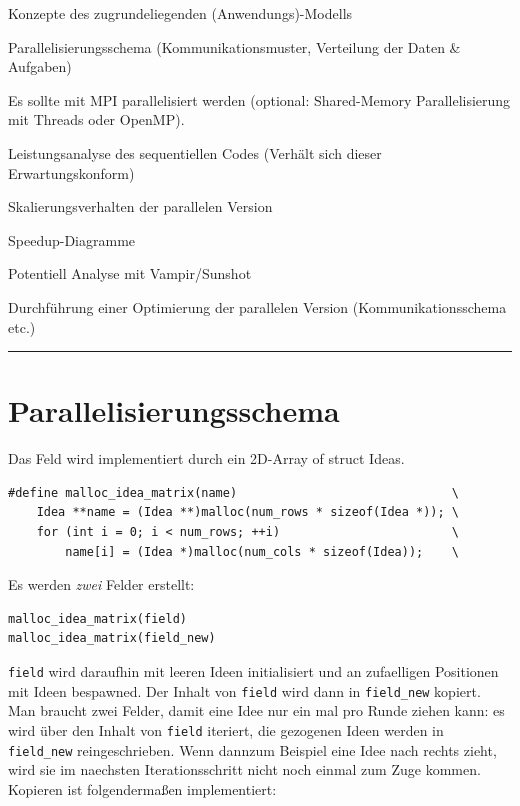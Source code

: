 Konzepte des zugrundeliegenden (Anwendungs)-Modells

Parallelisierungsschema (Kommunikationsmuster, Verteilung der Daten \&
Aufgaben)

Es sollte mit MPI parallelisiert werden (optional: Shared-Memory
Parallelisierung mit Threads oder OpenMP).

Leistungsanalyse des sequentiellen Codes (Verhält sich dieser
Erwartungskonform)

Skalierungsverhalten der parallelen Version

Speedup-Diagramme

Potentiell Analyse mit Vampir/Sunshot

Durchführung einer Optimierung der parallelen Version
(Kommunikationsschema etc.)

\begin{center}\rule{3in}{0.4pt}\end{center}

\section{Parallelisierungsschema}\label{parallelisierungsschema}

Das Feld wird implementiert durch ein 2D-Array of struct Ideas.

\begin{verbatim}
#define malloc_idea_matrix(name)                              \
    Idea **name = (Idea **)malloc(num_rows * sizeof(Idea *)); \
    for (int i = 0; i < num_rows; ++i)                        \
        name[i] = (Idea *)malloc(num_cols * sizeof(Idea));    \
\end{verbatim}

Es werden \emph{zwei} Felder erstellt:

\begin{verbatim}
malloc_idea_matrix(field)
malloc_idea_matrix(field_new)
\end{verbatim}

\texttt{field} wird daraufhin mit leeren Ideen initialisiert und an
zufaelligen Positionen mit Ideen bespawned. Der Inhalt von
\texttt{field} wird dann in \texttt{field\_new} kopiert. Man braucht
zwei Felder, damit eine Idee nur ein mal pro Runde ziehen kann: es wird
über den Inhalt von \texttt{field} iteriert, die gezogenen Ideen werden
in \texttt{field\_new} reingeschrieben. Wenn dannzum Beispiel eine Idee
nach rechts zieht, wird sie im naechsten Iterationsschritt nicht noch
einmal zum Zuge kommen. Kopieren ist folgendermaßen implementiert:

